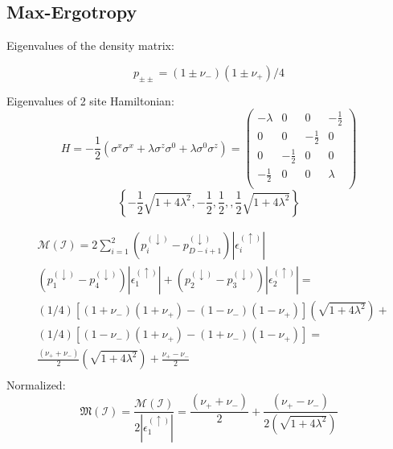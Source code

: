\documentclass[12pt,a4paper]{book}
\theoremstyle{definition}
\begin{document}
\clearpage
\subsection{Max-Ergotropy}\label{sec:max_twosites}


Eigenvalues of the density matrix:

\begin{equation}
	p_{\pm \pm } =(1 \pm \nu_-)(1 \pm \nu_+)/4
\end{equation}

Eigenvalues of 2 site Hamiltonian:
\begin{equation}
	H=-\frac{1}{2} \left(\sigma^{x} \sigma^{x}+\lambda\sigma^{z} \sigma^0+\lambda\sigma^0\sigma^{z}\right) =
	\left(
	\begin{array}{cccc}
		-\lambda  & 0 & 0 & -\frac{1}{2} \\
		0 & 0 & -\frac{1}{2} & 0 \\
		0 & -\frac{1}{2} & 0 & 0 \\
		-\frac{1}{2} & 0 & 0 & \lambda  \\
	\end{array}
	\right)
\end{equation}
\begin{equation}
	\left\{-\frac{1}{2} \sqrt{1+4 \lambda ^2},-\frac{1}{2},\frac{1}{2},,\frac{1}{2} \sqrt{1+4 \lambda ^2}\right\}
\end{equation}

\begin{equation}
	\begin{aligned}
		&
		\mathcal{M}(\mathcal{I})=2 \sum_{i=1}^ {2}\left(p_{i}^{(\downarrow)}-p_{D-i+1}^{(\downarrow)}\right)\left|\epsilon_{i}^{(\uparrow)}\right|	\\
		& \left(p_{1}^{(\downarrow)}-p_{4}^{(\downarrow)}\right)\left|\epsilon_{1}^{(\uparrow)}\right|+\left(p_{2}^{(\downarrow)}-p_{3}^{(\downarrow)}\right)\left|\epsilon_{2}^{(\uparrow)}\right|=\\
		& (1/4)\left[(1+\nu_-)(1+\nu_+)-(1-\nu_-)(1-\nu_+)\right] \left(\sqrt{1+4 \lambda ^2}\right) + \\
		&(1/4)\left[(1-\nu_-)(1+\nu_+)-(1+\nu_-)(1-\nu_+)\right] = \\
		&\frac{(\nu_+ + \nu_-)}{2}\left(\sqrt{1+4 \lambda ^2}\right)+\frac{\nu_+-\nu_-}{2} \\
	\end{aligned}
\end{equation}
Normalized:
\begin{equation}
	\mathfrak{M}(\mathcal{I}) = \frac{\mathcal{M}(\mathcal{I})}{2\left|\epsilon_{1}^{(\uparrow)}\right|} =\frac{(\nu_+ + \nu_-)}{2}+\frac{(\nu_+-\nu_-)} {2\left(\sqrt{1+4 \lambda ^2}\right)}
\end{equation}
\end{document}
